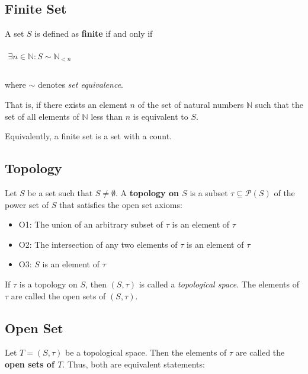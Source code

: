\subsection{Finite Set}
\label{sec:finite-set}

A set $S$ is defined as \textbf{finite} if and only if

\begin{math}
  \begin{array}{c}
    \\
    \exists n \in \mathbb{N}: S \sim \mathbb{N}_{< n}\\
    \\
  \end{array}
\end{math}

where $\sim$ denotes \textit{set equivalence}.

That is, if there exists an element $n$ of the set of natural numbers
$\mathbb{N}$ such that the set of all elements of $\mathbb{N}$ less
than $n$ is equivalent to $S$.

Equivalently, a finite set is a set with a count.

\subsection{Topology}
\label{sec:topology}

Let $S$ be a set such that $S \neq \emptyset$. A \textbf{topology on
  $S$} is a subset $\tau \subseteq \mathcal{P}(S)$ of the power set of
$S$ that satisfies the open set axioms:
\begin{itemize}
\item O1: The union of an arbitrary subset of $\tau$ is an element of
$\tau$
\item O2: The intersection of any two elements of $\tau$ is an element
of $\tau$
\item O3: $S$ is an element of $\tau$
\end{itemize}

If $\tau$ is a topology on $S$, then $(S, \tau)$ is called a
\textit{topological space}. The elements of $\tau$ are called the open
sets of $(S, \tau)$.

\subsection{Open Set}
\label{sec:open-set}

Let $T = (S, \tau)$ be a topological space. Then the elements of
$\tau$ are called the \textbf{open sets of $T$}. Thus, both are
equivalent statements:

